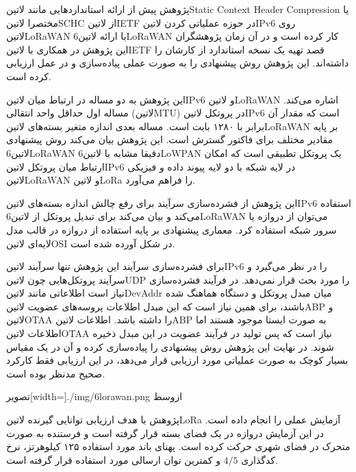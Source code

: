 پژوهش  پیش از ارائه استانداردهایی مانند ‌لاتین{Static Context Header Compression} یا مختصرا ‌لاتین{SCHC} از ‌لاتین{IETF} در حوزه عملیاتی کردن ‌لاتین{IPv6} روی ‌لاتین{LoRaWAN}
با ارائه ‌لاتین{6LoRaWAN} کار کرده است و در آن زمان پژوهشگران این پژوهش در همکاری با ‌لاتین{IETF} قصد تهیه یک نسخه استاندارد از کارشان را داشته‌اند. این پژوهش روش پیشنهادی را به صورت عملی پیاده‌سازی و در عمل ارزیابی کرده است.

این پژوهش به دو مساله در ارتباط میان ‌لاتین{IPv6} و ‌لاتین{LoRaWAN} اشاره می‌کند. مساله اول حداقل واحد انتقالی (‌لاتین{MTU}) در پروتکل ‌لاتین{IPv6} است که مقدار آن برابر با ۱۲۸۰ بایت است.
مساله بعدی اندازه متغیر بسته‌های ‌لاتین{LoRaWAN} بر پایه مقادیر مختلف برای فاکتور گسترش است. این پژوهش بیان می‌کند روش پیشنهادی ‌لاتین{6LoRaWAN}
دقیقا مشابه با ‌لاتین{6LoWPAN} یک پروتکل تطبیقی است که امکان ارتباط میان پروتکل ‌لاتین{IPv6} در لایه شبکه با دو لایه پیوند داده و فیزیکی ‌لاتین{LoRaWAN} و ‌لاتین{LoRa} را فراهم می‌آورد.

این پژوهش از فشرده‌سازی سرآیند برای رفع چالش اندازه بسته‌های ‌لاتین{IPv6} استفاده می‌کند و بیان می‌کند برای تبدیل پروتکل از ‌لاتین{6LoRaWAN} می‌توان از دروازه یا سرور شبکه استفاده کرد.
معماری پیشنهادی بر پایه استفاده از دروازه در قالب مدل لایه‌ای ‌لاتین{OSI} در شکل  آورده شده است.

برای فشرده‌سازی سرآیند این پژوهش تنها سرآیند ‌لاتین{IPv6} را در نظر می‌گیرد و سرآیند پروتکل‌هایی چون ‌لاتین{UDP} را مورد بحث قرار نمی‌دهد.
در فرآیند فشرده‌سازی نیاز است اطلاعاتی مانند ‌لاتین{DevAddr} میان مبدل پروتکل و دستگاه هماهنگ شده باشند، برای همین نیاز است که این مبدل اطلاعات پروسه‌های عضویت ‌لاتین{ABP} و ‌لاتین{OTAA}
را داشته باشد. اطلاعات ‌لاتین{ABP} به صورت ایستا موجود هستند اما اطلاعات ‌لاتین{OTAA} نیاز است که پس تولید در فرآیند عضویت در این مبدل ذخیره شوند.
در نهایت این پژوهش روش پیشنهادی را پیاده‌سازی کرده و آن در یک مقیاس بسیار کوچک به صورت عملیاتی مورد ارزیابی قرار می‌دهد، در این ارزیابی فقط کارکرد صحیح مدنظر بوده است.

‌تصویر[width=\textwidth]{./img/6lorawan.png}
‌ازوسط


پژوهش  با هدف ارزیابی توانایی گیرنده ‌لاتین{LoRa} آزمایش عملی را انجام داده است. در این آزمایش دروازه در یک فضای بسته قرار گرفته است و فرستنده
به صورت متحرک در فضای شهری حرکت کرده است. پهنای باند مورد استفاده ۱۲۵ کیلوهرتز، نرخ کدگذاری $4/5$ و کمترین توان ارسالی مورد استفاده قرار گرفته است.

